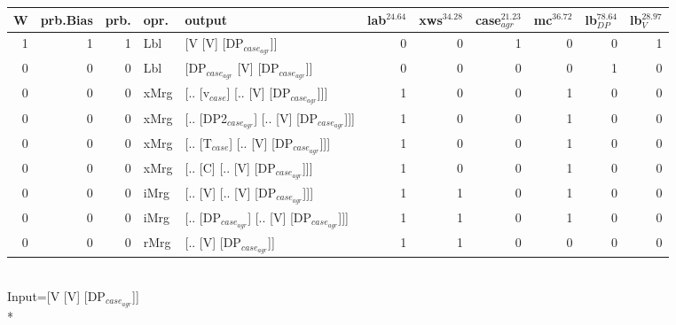 \begin{tabularx}{\linewidth}{rrrlXrrrrrr}
\hline
   W &   prb.Bias &   prb. & opr.   & output                                     &   lab$^{24.64}$ &   xws$^{34.28}$ &   case$_{agr}^{21.23}$ &   mc$^{36.72}$ &   lb$_{DP}^{78.64}$ &   lb$_{V}^{28.97}$ \\
\hline
   1 &       1 &   1 & Lbl  & [V [V] [DP$_{case_{agr}}$]]                      &             0 &             0 &                  1 &            0 &               0 &              1 \\
   0 &       0 &   0 & Lbl  & [DP$_{case_{agr}}$ [V] [DP$_{case_{agr}}$]]            &             0 &             0 &                  0 &            0 &               1 &              0 \\
   0 &       0 &   0 & xMrg & [.. [v$_{case}$] [.. [V] [DP$_{case_{agr}}$]]]       &             1 &             0 &                  0 &            1 &               0 &              0 \\
   0 &       0 &   0 & xMrg & [.. [DP2$_{case_{agr}}$] [.. [V] [DP$_{case_{agr}}$]]] &             1 &             0 &                  0 &            1 &               0 &              0 \\
   0 &       0 &   0 & xMrg & [.. [T$_{case}$] [.. [V] [DP$_{case_{agr}}$]]]       &             1 &             0 &                  0 &            1 &               0 &              0 \\
   0 &       0 &   0 & xMrg & [.. [C] [.. [V] [DP$_{case_{agr}}$]]]            &             1 &             0 &                  0 &            1 &               0 &              0 \\
   0 &       0 &   0 & iMrg & [.. [V] [.. [V] [DP$_{case_{agr}}$]]]            &             1 &             1 &                  0 &            1 &               0 &              0 \\
   0 &       0 &   0 & iMrg & [.. [DP$_{case_{agr}}$] [.. [V] [DP$_{case_{agr}}$]]]  &             1 &             1 &                  0 &            1 &               0 &              0 \\
   0 &       0 &   0 & rMrg & [.. [V] [DP$_{case_{agr}}$]]                     &             1 &             1 &                  0 &            0 &               0 &              0 \\
\hline
\end{tabularx}\endgroup\\
\begingroup\scriptsize Input=[V [V] [DP$_{case_{agr}}$]]\\*
